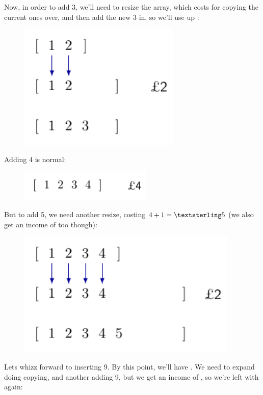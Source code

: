 Now, in order to add 3, we'll need to resize the array, which costs
 for copying the current ones over, and then add the new 3 in, so
we'll use up :

\begin{figure}[H]
  \centering
  \includegraphics[height=60mm]{diagrams/banker3.pdf}
  \label{banker3}
\end{figure}

Adding 4 is normal:

\begin{figure}[H]
  \centering
  \includegraphics[height=15mm]{diagrams/banker4.pdf}
  \label{banker4}
\end{figure}

But to add 5, we need another resize, costing $4 + 1 = \textsterling 5$ (we also
get an income of  too though):

\begin{figure}[H]
  \centering
  \includegraphics[height=60mm]{diagrams/banker5.pdf}
  \label{banker5}
\end{figure}

Lets whizz forward to inserting 9. By this point, we'll have .
We need to expand  doing copying, and another adding 9, but we
get an income of , so we're left with  again:

